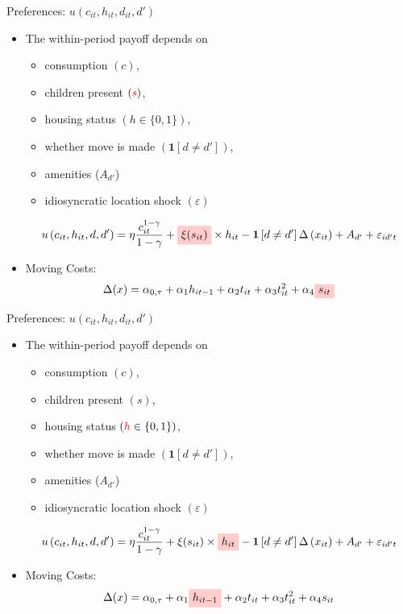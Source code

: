 \documentclass[12pt,english, aspectratio=169]{beamer}
\begin{document}
\begin{frame}{Preferences: $u(c_{it},h_{it},d_{it},d')$}
\begin{itemize}
\item The within-period payoff depends on 

\begin{itemize}
\item consumption $(c)$, 
\item children present $({\color{red}{s}})$, 
\item housing status $(h\in\{0,1\})$, 
\item whether move is made \textrm{$\left(\mathbf{1}\left[d\neq d'\right]\right)$,}
\item amenities ($A_{d'}$)
\item idiosyncratic location shock $\left(\varepsilon\right)$
\end{itemize}
\[
u\left(c_{it},h_{it},d,d'\right)=\eta \frac{c_{it}^{1-\gamma}}{1-\gamma} + 
\tikz[baseline]{
            \node[fill=red!20,anchor=base] (t1)
            {$ \xi(s_{it}) $};
        } \times h_{it}-\mathbf{1}\left[d\neq d'\right]\Delta\left(x_{it}\right)+A_{d'}+\varepsilon_{id't}
\]

\item Moving Costs:
\[
\Delta(x)=\alpha_{0,\tau}+\alpha_{1}h_{it-1}+\alpha_{2}t_{it}+\alpha_{3}t_{it}^{2}+\alpha_{4}
\tikz[baseline]{
            \node[fill=red!20,anchor=base] (t2)
            {$ s_{it}$};
            }
\]

\end{itemize}
\end{frame}

\begin{frame}{Preferences: $u(c_{it},h_{it},d_{it},d')$}
\begin{itemize}
\item The within-period payoff depends on 

\begin{itemize}
\item consumption $(c)$, 
\item children present $(s)$, 
\item housing status $({\color{red}{h}}\in\{0,1\})$, 
\item whether move is made \textrm{$\left(\mathbf{1}\left[d\neq d'\right]\right)$,}
\item amenities ($A_{d'}$)
\item idiosyncratic location shock $\left(\varepsilon\right)$
\end{itemize}
\[
u\left(c_{it},h_{it},d,d'\right)=\eta \frac{c_{it}^{1-\gamma}}{1-\gamma} + \xi(s_{it})\times
\tikz[baseline]{
            \node[fill=red!20,anchor=base] (t1)
            {$ h_{it}$};
        } -\mathbf{1}\left[d\neq d'\right]\Delta\left(x_{it}\right)+A_{d'}+\varepsilon_{id't}
\]

\item Moving Costs:
\[
\Delta(x)=\alpha_{0,\tau}+\alpha_{1}
\tikz[baseline]{
            \node[fill=red!20,anchor=base] (t2)
            {$ h_{it-1}$};
            }+\alpha_{2}t_{it}+\alpha_{3}t_{it}^{2}+\alpha_{4}s_{it}
\]

\end{itemize}
\end{frame}
\end{document}
